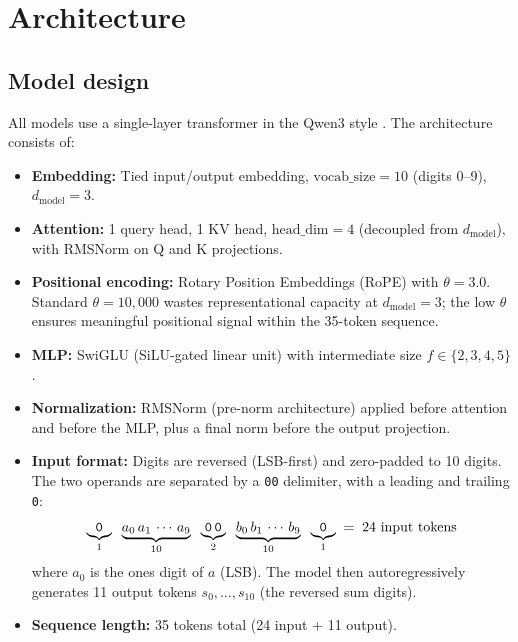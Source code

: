 \documentclass[11pt]{article}
\begin{document}
\section{Architecture}
\label{sec:arch}

\subsection{Model design}

All models use a single-layer transformer in the Qwen3 style
\citep{yang2024qwen2}. The architecture consists of:

\begin{itemize}[leftmargin=*, itemsep=2pt]
  \item \textbf{Embedding:} Tied input/output embedding,
    $\text{vocab\_size}=10$ (digits 0--9), $d_\text{model}=3$.
  \item \textbf{Attention:} 1 query head, 1 KV head, $\text{head\_dim}=4$
    (decoupled from $d_\text{model}$), with RMSNorm on Q and K projections.
  \item \textbf{Positional encoding:} Rotary Position Embeddings (RoPE)
    \citep{su2024roformer} with $\theta=3.0$. Standard $\theta=10{,}000$
    wastes representational capacity at $d_\text{model}=3$; the low $\theta$
    ensures meaningful positional signal within the 35-token sequence.
  \item \textbf{MLP:} SwiGLU (SiLU-gated linear unit) \citep{shazeer2020glu}
    with intermediate size $f \in \{2, 3, 4, 5\}$.
  \item \textbf{Normalization:} RMSNorm (pre-norm architecture) applied before
    attention and before the MLP, plus a final norm before the output
    projection.
  \item \textbf{Input format:} Digits are reversed (LSB-first) and
    zero-padded to 10 digits. The two operands are separated by a
    \texttt{00} delimiter, with a leading and trailing \texttt{0}:
    \[
      \underbrace{\texttt{0}}_1 \;\;
      \underbrace{a_0\, a_1\, \cdots\, a_9}_{10} \;\;
      \underbrace{\texttt{0\,0}}_2 \;\;
      \underbrace{b_0\, b_1\, \cdots\, b_9}_{10} \;\;
      \underbrace{\texttt{0}}_1
      \;=\; 24 \text{ input tokens}
    \]
    where $a_0$ is the ones digit of $a$ (LSB). The model then
    autoregressively generates 11 output tokens $s_0, \ldots, s_{10}$
    (the reversed sum digits).
  \item \textbf{Sequence length:} 35 tokens total (24 input + 11 output).
\end{itemize}
\end{document}
